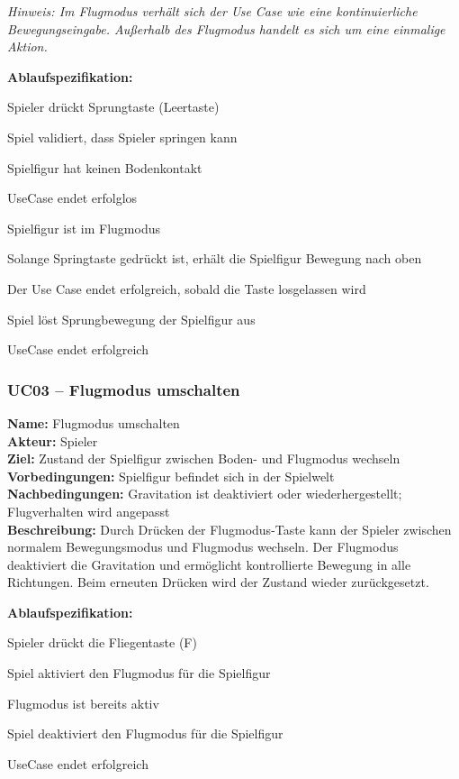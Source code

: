 \documentclass{article}
\begin{document}
\textit{Hinweis: Im Flugmodus verhält sich der Use Case wie eine kontinuierliche Bewegungseingabe. Au\ss{}erhalb des Flugmodus handelt es sich um eine einmalige Aktion.}

\textbf{Ablaufspezifikation:}
\begin{description}[style=nextline,leftmargin=1.9cm,labelwidth=1.6cm]
  \item[1.] Spieler drückt Sprungtaste (Leertaste)
  \item[2.] Spiel validiert, dass Spieler springen kann
  \item[2a.] Spielfigur hat keinen Bodenkontakt
  \item[2a.1.] UseCase endet erfolglos
  \item[2b.] Spielfigur ist im Flugmodus
  \item[2b.1.] Solange Springtaste gedrückt ist, erhält die Spielfigur Bewegung nach oben
  \item[2b.2.] Der Use Case endet erfolgreich, sobald die Taste losgelassen wird
  \item[3.] Spiel löst Sprungbewegung der Spielfigur aus
  \item[4.] UseCase endet erfolgreich
\end{description}

\newpage

\subsubsection*{UC03 – Flugmodus umschalten}

\textbf{Name:} Flugmodus umschalten \\
\textbf{Akteur:} Spieler \\
\textbf{Ziel:} Zustand der Spielfigur zwischen Boden- und Flugmodus wechseln \\
\textbf{Vorbedingungen:} Spielfigur befindet sich in der Spielwelt \\
\textbf{Nachbedingungen:} Gravitation ist deaktiviert oder wiederhergestellt; Flugverhalten wird angepasst \\
\textbf{Beschreibung:} Durch Drücken der Flugmodus-Taste kann der Spieler zwischen normalem Bewegungsmodus und Flugmodus wechseln. Der Flugmodus deaktiviert die Gravitation und ermöglicht kontrollierte Bewegung in alle Richtungen. Beim erneuten Drücken wird der Zustand wieder zurückgesetzt.

\textbf{Ablaufspezifikation:}
\begin{description}[style=nextline,leftmargin=1.9cm,labelwidth=1.6cm]
  \item[1.] Spieler drückt die Fliegentaste (F)
  \item[2.] Spiel aktiviert den Flugmodus für die Spielfigur
  \item[2a.] Flugmodus ist bereits aktiv
  \item[2a.1.] Spiel deaktiviert den Flugmodus für die Spielfigur
  \item[3.] UseCase endet erfolgreich
\end{description}
\end{document}
